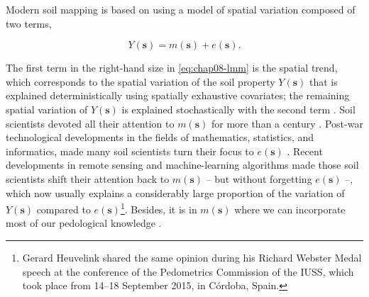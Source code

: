 
Modern soil mapping is based on using a model of spatial variation composed of two terms, 

\begin{equation}
 Y(\boldsymbol{s}) = m(\boldsymbol{s}) + e(\boldsymbol{s}).
\end{equation}\label{eq:chap08-lmm}

\def\footgerard{\footnote{Gerard Heuvelink shared the same opinion during his Richard Webster Medal speech at 
the conference of the Pedometrics Commission of the IUSS, which took place from 14--18 September 2015, in 
Córdoba, Spain.}}

\noindent The first term in the right-hand size in \autoref{eq:chap08-lmm} is the spatial trend, 
which corresponds to the spatial variation of the soil property $Y(\boldsymbol{s})$ that is explained 
deterministically using spatially exhaustive covariates; the remaining spatial variation of 
$Y(\boldsymbol{s})$ is explained stochastically with the second term \cite{Cressie1993}. Soil scientists 
devoted all their attention to $m(\boldsymbol{s})$ for more than a century \cite{Jenny1961, Florinsky2012}. 
Post-war technological developments in the fields of mathematics, statistics, and informatics, made many soil 
scientists turn their focus to $e(\boldsymbol{s})$ \cite{WebsterEtAl1990}. Recent developments in remote 
sensing and machine-learning algorithms made those soil scientists shift their attention back to 
$m(\boldsymbol{s})$ \cite{MooreEtAl1993} -- but without forgetting $e(\boldsymbol{s})$ \cite{OdehEtAl1994} 
--, which now usually explains a considerably large proportion of the variation of $Y(\boldsymbol{s})$ 
compared to $e(\boldsymbol{s})$\footgerard. Besides, it is in $m(\boldsymbol{s})$ where we can incorporate 
most 
of our pedological knowledge \cite{Lark2012}.

